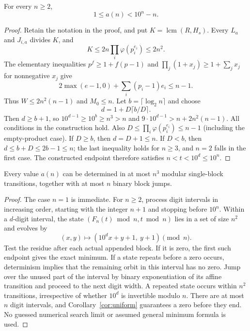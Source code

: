 \begin{corollary}\label{cor:uniform}
For every $n\ge2$,
\[
 1\le a(n)<10^n-n.
\]
\end{corollary}
\begin{proof}
Retain the notation in the proof, and put $K=\operatorname{lcm}(R,H_s)$.
Every $L_a$ and $J_{i,a}$ divides $K$, and
\[
 K\le 2n\prod_i\varphi(p_i^{e_i})\le2n^2.
\]
The elementary inequalities $p^f\ge1+f(p-1)$ and
$\prod_j(1+x_j)\ge1+\sum_j x_j$ for nonnegative $x_j$ give
\[
 2\max(e-1,0)+\sum_i(p_i-1)e_i\le n-1.
\]
Thus $W\le2n^2(n-1)$ and $M_0\le n$.
Let $b=\lceil\log_2 n\rceil$ and choose
\[
 d=1+D\lceil b/D\rceil.
\]
Then $d\ge b+1$, so $10^{d-1}\ge10^b\ge n^3>n$ and
$9\cdot10^{d-1}>n+2n^2(n-1)$. All conditions in the construction hold.
Also $D\le\prod_i\varphi(p_i^{e_i})\le n-1$ (including the
empty-product case). If $D\ge b$, then $d=D+1\le n$.
If $D<b$, then $d\le b+D\le2b-1\le n$; the last inequality holds
for $n\ge3$, and $n=2$ falls in the first case.
The constructed endpoint therefore satisfies $n<t<10^d\le10^n$.
\end{proof}

\begin{proposition}\label{prop:algorithm}
Every value $a(n)$ can be determined in at most $n^3$ modular
single-block transitions, together with at most $n$ binary block jumps.
\end{proposition}
\begin{proof}
The case $n=1$ is immediate. For $n\ge2$, process digit intervals
in increasing order, starting with the integer $n+1$ and stopping before
$10^n$. Within a $d$-digit interval, the state
$(F_n(t)\bmod n,t\bmod n)$ lies in a set of size $n^2$ and evolves by
\[
 (x,y)\longmapsto(10^d x+y+1,\ y+1)\pmod n.
\]
Test the residue after each actual appended block. If it is zero,
the first such endpoint gives the exact minimum. If a state repeats
before a zero occurs, determinism implies that the remaining orbit
in this interval has no zero. Jump over the unused part of the interval
by binary exponentiation of its affine transition and proceed to the
next digit width. A repeated state occurs within $n^2$ transitions,
irrespective of whether $10^d$ is invertible modulo $n$.
There are at most $n$ digit intervals, and Corollary~\ref{cor:uniform}
guarantees a zero before they end. No guessed numerical search limit
or assumed general minimum formula is used.
\end{proof}

